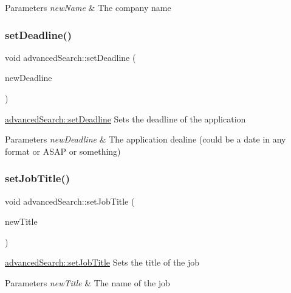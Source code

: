 \begin{DoxyParams}{Parameters}
{\em new\+Name} & The company name \\
\hline
\end{DoxyParams}
\mbox{\label{classadvanced_search_aeaacf5b995f4169c38d4381e17bc0969}} 
\subsubsection{\texorpdfstring{setDeadline()}{setDeadline()}}
{\footnotesize\ttfamily void advanced\+Search\+::set\+Deadline (\begin{DoxyParamCaption}\item[{Q\+String}]{new\+Deadline }\end{DoxyParamCaption})}



\mbox{\hyperlink{classadvanced_search_aeaacf5b995f4169c38d4381e17bc0969}{advanced\+Search\+::set\+Deadline}} Sets the deadline of the application 


\begin{DoxyParams}{Parameters}
{\em new\+Deadline} & The application dealine (could be a date in any format or \textquotesingle{}A\+S\+AP\textquotesingle{} or something) \\
\hline
\end{DoxyParams}
\mbox{\label{classadvanced_search_a698024f20a64fd27b1b352bce5c6f527}} 
\subsubsection{\texorpdfstring{setJobTitle()}{setJobTitle()}}
{\footnotesize\ttfamily void advanced\+Search\+::set\+Job\+Title (\begin{DoxyParamCaption}\item[{Q\+String}]{new\+Title }\end{DoxyParamCaption})}



\mbox{\hyperlink{classadvanced_search_a698024f20a64fd27b1b352bce5c6f527}{advanced\+Search\+::set\+Job\+Title}} Sets the title of the job 


\begin{DoxyParams}{Parameters}
{\em new\+Title} & The name of the job \\
\hline
\end{DoxyParams}
\mbox{\label{classadvanced_search_a72e3b5ac068d875070165e865a03410c}} 
